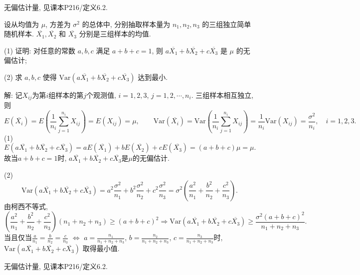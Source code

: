 \documentclass[standard]{ExBook}
\renewenvironment{shaded}{%
  \def\FrameCommand{\fboxsep=\FrameSep \colorbox{shadecolor}}%
  \MakeFramed{\advance\hsize-\width \FrameRestore}%
}{%
  \endMakeFramed
}
\begin{document}
\begin{qitems}
\textcolor{themeColor}{\selectfont {} 无偏估计量, 见课本P216/定义6.2.}

\vspace{2.5cm-5em}

    \begin{bbox}
    \begin{shaded}
        \qitem
设从均值为 \(\mu\), 方差为 \(\sigma^2\) 的总体中, 分别抽取样本量为 \(n_1, n_2, n_3\) 的三组独立简单随机样本. \(\overline{X_1}, \overline{X_2}\) 和 \(\overline{X_3}\) 分别是三组样本的均值.

(1) 证明: 对任意的常数 \(a, b, c\) 满足 \(a + b + c = 1\), 则 \(a\overline{X_1} + b\overline{X_2} + c\overline{X_3}\) 是 \(\mu\) 的无偏估计;

(2) 求 \(a, b, c\) 使得 \(\text{Var}(a\overline{X_1} + b\overline{X_2} + c\overline{X_3})\) 达到最小.
    \end{shaded}
    \end{bbox}

\vspace{\dimexpr2.5cm-5em\relax}

解: 记$X_{ij}$为第$i$组样本的第$j$个观测值, $i=1,2,3$, $j=1,2,\cdots,n_i$. 三组样本相互独立, 则
$$
E(\overline{X_i})=E\left(\frac{1}{n_i}\sum_{j=1}^{n_i}X_{ij}\right)=E(X_{ij})=\mu,\qquad
\mathrm{Var}(\overline{X_i})=\mathrm{Var}\left(\frac{1}{n_i}\sum_{j=1}^{n_i}X_{ij}\right)=\frac{1}{n_i}\mathrm{Var}(X_{ij})=\frac{\sigma^2}{n_i},\quad i=1,2,3.
$$
(1)
$$
E(a\overline{X_1}+b\overline{X_2}+c\overline{X_3})
=aE(\overline{X_1})+bE(\overline{X_2})+cE(\overline{X_3})
=(a+b+c)\mu=\mu.
$$
故当$a+b+c=1$时, $a\overline{X_1}+b\overline{X_2}+c\overline{X_3}$是$\mu$的无偏估计.

(2)
$$
\mathrm{Var}(a\overline{X_1}+b\overline{X_2}+c\overline{X_3})
=a^2\frac{\sigma^2}{n_1}+b^2\frac{\sigma^2}{n_2}+c^2\frac{\sigma^2}{n_3}
=\sigma^2\left(\frac{a^2}{n_1}+\frac{b^2}{n_2}+\frac{c^2}{n_3}\right).
$$
由柯西不等式,
$$
\left(\frac{a^2}{n_1}+\frac{b^2}{n_2}+\frac{c^2}{n_3}\right)(n_1+n_2+n_3)
\geq (a+b+c)^2
\Longrightarrow
\mathrm{Var}(a\overline{X_1}+b\overline{X_2}+c\overline{X_3})
\geq \frac{\sigma^2(a+b+c)^2}{n_1+n_2+n_3}.
$$
当且仅当$\displaystyle\frac{a}{n_1}=\frac{b}{n_2}=\frac{c}{n_3}$ $\Longleftrightarrow$ $a=\frac{n_1}{n_1+n_2+n_3}$, $b=\frac{n_2}{n_1+n_2+n_3}$, $c=\frac{n_3}{n_1+n_2+n_3}$时, \(\text{Var}(a\overline{X_1} + b\overline{X_2} + c\overline{X_3})\) 取得最小值.

\textcolor{themeColor}{\selectfont {} 无偏估计量, 见课本P216/定义6.2.}


\end{qitems}
\end{document}
